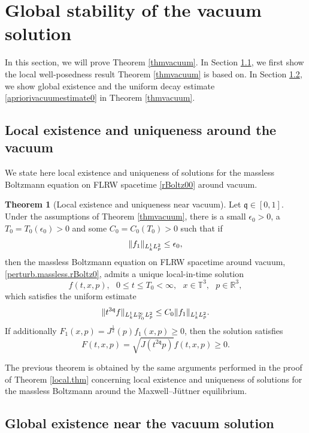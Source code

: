 \documentclass[reqno]{amsart}
\newcommand{\pv}{p}
\def\R{\mathbb R}
\newcommand{\qq}{\mathfrak{q}}
\newcommand{\tTq}{t^{3\qq}}
\newcommand{\T}{\mathbb{T}}
\theoremstyle{definition}
\newtheorem{theorem}{Theorem}
\numberwithin{equation}{section}
\numberwithin{theorem}{section}
\begin{document}
\section{Global stability of the vacuum solution}\label{sec.sol.nearby.vacuum}


In this section, we will prove Theorem \ref{thmvacuum}. In Section \ref{subsecexistuniqvac}, we first show the local well-posedness result Theorem \ref{thmvacuum} is based on. In Section \ref{subsglbalexistvac}, we show global existence and the uniform decay estimate \eqref{apriorivacuumestimate0} in Theorem \ref{thmvacuum}. 

\subsection{Local existence and uniqueness around the vacuum}\label{subsecexistuniqvac}

We state here local existence and uniqueness of solutions for the massless Boltzmann equation on FLRW spacetime \eqref{rBoltz00} around vacuum. 


\begin{theorem}[Local existence and uniqueness near vacuum]\label{local.thm2}
Let \(\qq\in [0,1]\). Under the assumptions of Theorem \ref{thmvacuum}, there is a small $\epsilon_0>0$, a $T_0=T_0(\epsilon_0)>0$ and some  $C_0=C_0(T_0)>0$ such that if 
\begin{equation}\notag 
\| f_{1}\|_{L_{k}^1L^2_{\pv}}\leq\epsilon_0,
\end{equation}
then the massless Boltzmann equation on FLRW spacetime around vacuum, \eqref{perturb.massless.rBoltz0},
 admits a unique local-in-time solution
$$
f(t,x,\pv),~~ \ 0\leq t\leq T_0<\infty, ~~\ x\in  \T^3,~~\ \pv\in \R^3,
$$
which satisfies the  uniform estimate
\begin{equation}\notag 
\| \tTq f\|_{L^1_{{k}}L^\infty_{T_0}L^2_{\pv}} 
\leq C_{0}
\|f_1\|_{L_{{k}}^1L^2_{\pv}}.
\end{equation}
If additionally 
$F_1(x,\pv)= J^{\frac{1}{2}}(\pv)f_1(x,\pv)\geq0$,
then the solution satisfies
$$
F(t,{x},\pv)= \sqrt{J(t^{2\qq}p) }f(t,{x},\pv)\geq0.
$$
\end{theorem}

The previous theorem is obtained by the same arguments performed in the proof of Theorem \ref{local.thm} concerning local existence and uniqueness of solutions for the massless Boltzmann around the Maxwell--J\"uttner equilibrium.

\subsection{Global existence near the vacuum solution}\label{subsglbalexistvac}
\end{document}
